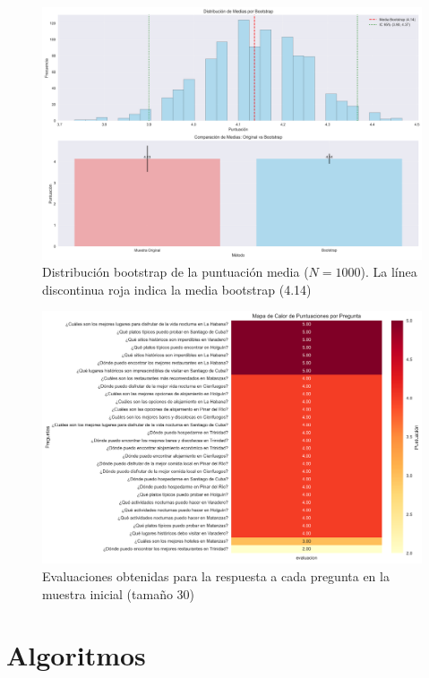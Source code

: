 \documentclass[10pt]{llncs}
\begin{document}
\begin{figure}
\centering
\includegraphics[width=1\textwidth]{../src/experiments/specialized_agents/bootstrap_distribution_20250617-171856.png}
\caption{Distribución bootstrap de la puntuación media ($N=1000$). La línea discontinua roja indica la media bootstrap (4.14)}
\label{fig:boot_dist_2}
\end{figure}

\begin{figure}
\centering
\includegraphics[width=1\textwidth]{../src/experiments/specialized_agents/quality_heatmap_20250617-171856.png}
\caption{Evaluaciones obtenidas para la respuesta a cada pregunta en la muestra inicial (tamaño 30)}
\label{fig:eval_2}
\end{figure}

\newpage
\section{Algoritmos}
\end{document}
